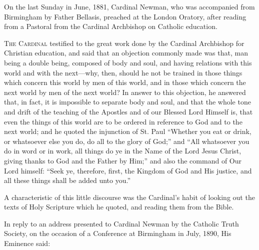 
On the last Sunday in June, 1881, Cardinal Newman, who was accompanied
from Birmingham by Father Bellasis, preached at the London Oratory,
after reading from a Pastoral from the Cardinal Archbishop on Catholic
education.

T\textsc{he}
C\textsc{ardinal} testified to the great work done by the
Cardinal Archbishop for Christian education, and said that an
objection commonly made was that, man being a double being, composed
of body and soul, and having relations with this world and with the
next—why, then, should he not be trained in those things which
concern this world by men of this world, and in those which concern
the next world by men of the next world? In answer to this objection,
he answered that, in fact, it is impossible to separate body and soul,
and that the whole tone and drift of the teaching of the Apostles and
of our Blessed Lord Himself is, that even the things of this world are
to be ordered in reference to God and to the next world; and he quoted
the injunction of St. Paul ``Whether you eat or drink, or whatsoever
else you do, do all to the glory of God;'' and ``All whatsoever you do
in word or in work, all things do ye in the Name of the Lord Jesus
Christ, giving thanks to God and the Father by Him;'' and also the
command of Our Lord himself: ``Seek ye, therefore, first, the Kingdom
of God and His justice, and all these things shall be added unto you.''

A
characteristic of this little discourse was the Cardinal's habit of
looking out the texts of Holy Scripture which he quoted, and reading
them from the Bible.


In reply to an address presented to Cardinal Newman by the Catholic
Truth Society, on the occasion of a Conference at Birmingham in July,
1890, His Eminence said:

